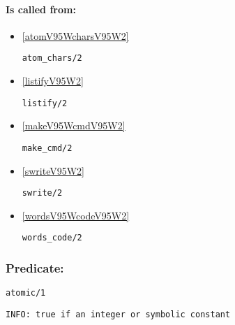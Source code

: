 \paragraph{Is called from:} 
\begin{itemize}
\item \ref{atomV95WcharsV95W2} 
\begin{verbatim}
atom_chars/2
\end{verbatim}

\item \ref{listifyV95W2} 
\begin{verbatim}
listify/2
\end{verbatim}

\item \ref{makeV95WcmdV95W2} 
\begin{verbatim}
make_cmd/2
\end{verbatim}

\item \ref{swriteV95W2} 
\begin{verbatim}
swrite/2
\end{verbatim}

\item \ref{wordsV95WcodeV95W2} 
\begin{verbatim}
words_code/2
\end{verbatim}

\end{itemize}

\subsubsection{Predicate:} \label{atomicV95W1}

\begin{verbatim}
atomic/1
\end{verbatim}

{\small \begin{verbatim}
INFO: true if an integer or symbolic constant

\end{verbatim}}

